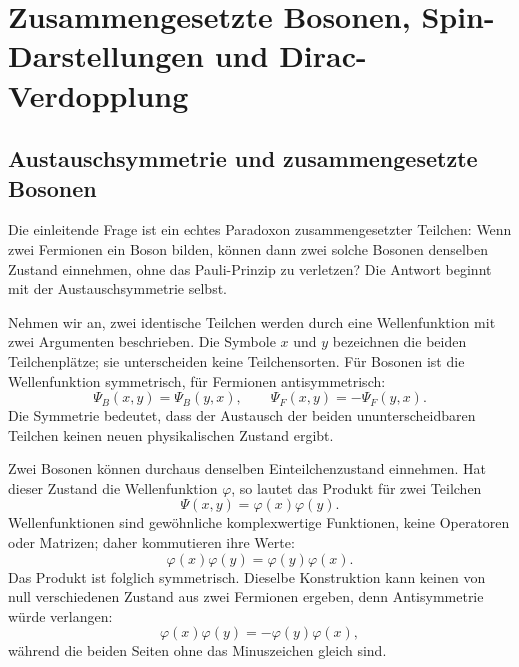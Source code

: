 \chapter{Zusammengesetzte Bosonen, Spin-Darstellungen und Dirac-Verdopplung}

\section{Austauschsymmetrie und zusammengesetzte Bosonen}

Die einleitende Frage ist ein echtes Paradoxon zusammengesetzter Teilchen: Wenn zwei Fermionen ein Boson bilden, können dann zwei solche Bosonen denselben Zustand einnehmen, ohne das Pauli-Prinzip zu verletzen? Die Antwort beginnt mit der Austauschsymmetrie selbst.

Nehmen wir an, zwei identische Teilchen werden durch eine Wellenfunktion mit zwei Argumenten beschrieben. Die Symbole \(x\) und \(y\) bezeichnen die beiden Teilchenplätze; sie unterscheiden keine Teilchensorten. Für Bosonen ist die Wellenfunktion symmetrisch, für Fermionen antisymmetrisch:
\begin{equation}
\Psi_B(x,y)=\Psi_B(y,x),
\qquad
\Psi_F(x,y)=-\Psi_F(y,x).
\end{equation}
Die Symmetrie bedeutet, dass der Austausch der beiden ununterscheidbaren Teilchen keinen neuen physikalischen Zustand ergibt.

Zwei Bosonen können durchaus denselben Einteilchenzustand einnehmen. Hat dieser Zustand die Wellenfunktion \(\varphi\), so lautet das Produkt für zwei Teilchen
\begin{equation}
\Psi(x,y)=\varphi(x)\varphi(y).
\end{equation}
Wellenfunktionen sind gewöhnliche komplexwertige Funktionen, keine Operatoren oder Matrizen; daher kommutieren ihre Werte:
\begin{equation}
\varphi(x)\varphi(y)=\varphi(y)\varphi(x).
\end{equation}
Das Produkt ist folglich symmetrisch. Dieselbe Konstruktion kann keinen von null verschiedenen Zustand aus zwei Fermionen ergeben, denn Antisymmetrie würde verlangen:
\begin{equation}
\varphi(x)\varphi(y)=-\varphi(y)\varphi(x),
\end{equation}
während die beiden Seiten ohne das Minuszeichen gleich sind.

